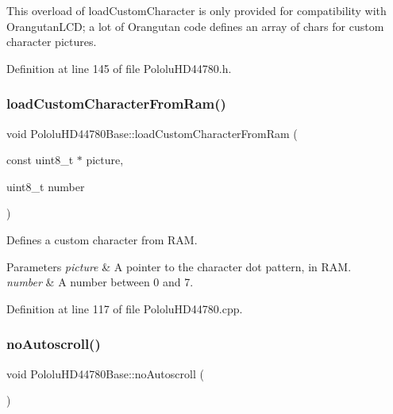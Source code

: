 This overload of load\+Custom\+Character is only provided for compatibility with Orangutan\+L\+CD; a lot of Orangutan code defines an array of chars for custom character pictures. 

Definition at line 145 of file Pololu\+H\+D44780.\+h.

\mbox{\label{class_pololu_h_d44780_base_a72674b5466690b49b639ae2ec3e4983f}} 
\subsubsection{\texorpdfstring{load\+Custom\+Character\+From\+Ram()}{loadCustomCharacterFromRam()}}
{\footnotesize\ttfamily void Pololu\+H\+D44780\+Base\+::load\+Custom\+Character\+From\+Ram (\begin{DoxyParamCaption}\item[{const uint8\+\_\+t $\ast$}]{picture,  }\item[{uint8\+\_\+t}]{number }\end{DoxyParamCaption})\hspace{0.3cm}{\ttfamily [inherited]}}

Defines a custom character from R\+AM. 
\begin{DoxyParams}{Parameters}
{\em picture} & A pointer to the character dot pattern, in R\+AM. \\
\hline
{\em number} & A number between 0 and 7. \\
\hline
\end{DoxyParams}


Definition at line 117 of file Pololu\+H\+D44780.\+cpp.

\mbox{\label{class_pololu_h_d44780_base_aee80e23d270913dd2c353e7bd5408249}} 
\subsubsection{\texorpdfstring{no\+Autoscroll()}{noAutoscroll()}}
{\footnotesize\ttfamily void Pololu\+H\+D44780\+Base\+::no\+Autoscroll (\begin{DoxyParamCaption}{ }\end{DoxyParamCaption})\hspace{0.3cm}{\ttfamily [inherited]}}

